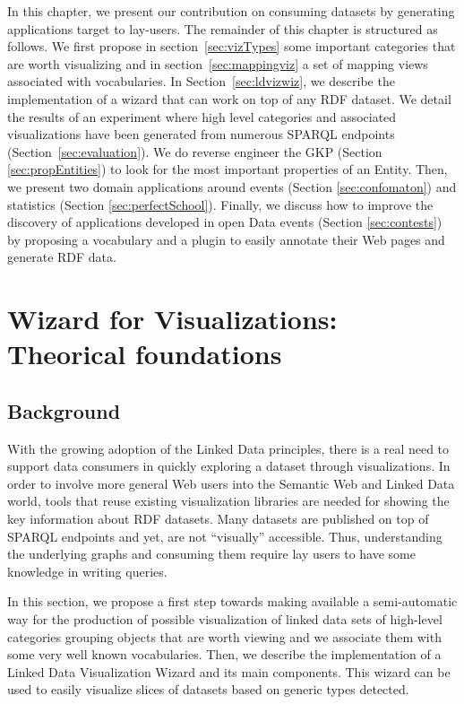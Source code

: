 In this chapter, we present our contribution on consuming datasets by generating applications target to lay-users. The remainder  of this chapter is structured as follows. We first propose in section~\ref{sec:vizTypes} some important categories that are worth visualizing and in section~\ref{sec:mappingviz} a set of mapping views associated with vocabularies. In Section~\ref{sec:ldvizwiz}, we describe the implementation of a wizard that can work on top of any RDF dataset. We detail the results of an experiment where high level categories and associated visualizations have been generated from numerous SPARQL endpoints (Section~\ref{sec:evaluation}). We do reverse engineer the GKP (Section \ref{sec:propEntities}) to look for the most important properties of an Entity. Then, we present two domain applications around events (Section \ref{sec:confomaton}) and statistics (Section \ref{sec:perfectSchool}). Finally, we discuss how to improve the discovery of applications developed in open Data events (Section \ref{sec:contests}) by proposing a vocabulary and a plugin to easily annotate their Web pages and generate RDF data.


\section{Wizard for Visualizations: Theorical foundations}
\label{sec:wizviz}

\subsection*{Background}
With the growing adoption of the Linked Data principles, there is a real need to support data consumers in quickly exploring a dataset through visualizations. In order to involve more general Web users into the Semantic Web and Linked Data world, tools that reuse existing visualization libraries are needed for showing the key information about RDF datasets. Many datasets are published on top of SPARQL endpoints and yet, are not ``visually'' accessible. Thus, understanding the underlying graphs and consuming them require lay users to have some knowledge in writing queries.

In this section, we propose a first step towards making available a semi-automatic way for the production of possible visualization of linked data sets of high-level categories grouping objects that are worth viewing and we associate them with some very well known vocabularies. Then, we describe the implementation of a Linked Data Visualization Wizard and its main components. This wizard can be used to easily visualize slices of datasets based on generic types detected.


